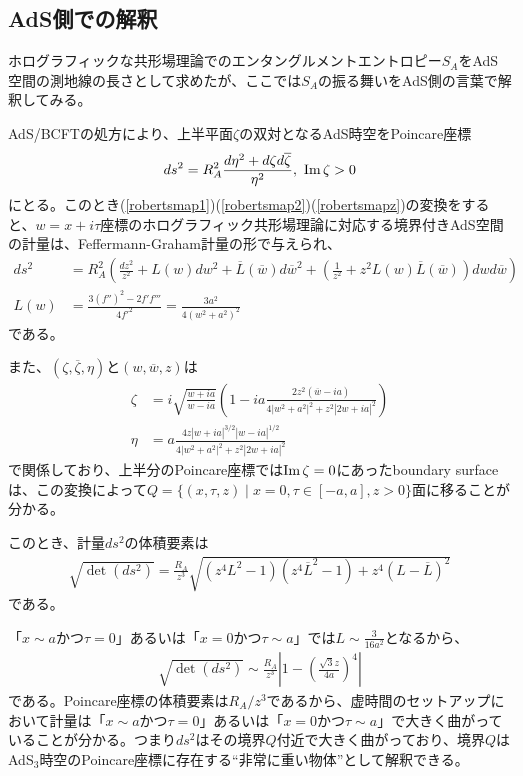 \subsection{AdS側での解釈}
ホログラフィックな共形場理論でのエンタングルメントエントロピー$S_A$をAdS空間の測地線の長さとして求めたが、ここでは$S_A$の振る舞いをAdS側の言葉で解釈してみる。

AdS/BCFTの処方により、上半平面$\zeta$の双対となるAdS時空をPoincare座標
\begin{align}
ds^2 = R_A^2 \frac{d\eta^2+d\zeta d\overline{\zeta}}{\eta^2},\ \text{Im}\, \zeta>0
\end{align}
にとる。このとき(\ref{robertsmap1})(\ref{robertsmap2})(\ref{robertsmapz})の変換をすると、$w=x+i\tau$座標のホログラフィック共形場理論に対応する境界付きAdS空間の計量は、Feffermann-Graham計量の形で与えられ、
\begin{align}
ds^2&=R_A^2 \left( \frac{dz^2}{z^2}+L(w)dw^2+\overline{L}(\overline{w})d\overline{w}^2+\left( \frac{1}{z^2}+ z^2L(w)\overline{L}(\overline{w})\right)dwd\overline{w}  \right)\\
L(w)&=\frac{3(f'')^2-2f'f'''}{4f'^2}=\frac{3a^2}{4(w^2+a^2)^2}
\end{align}
である。

また、$(\zeta,\overline{\zeta},\eta)$と$(w,\overline{w},z)$は
\begin{align}
\zeta&=i\sqrt{\frac{w+ia}{w-ia}}\left( 1-ia\frac{2z^2(\overline{w}-ia)}{4|w^2+a^2|^2+z^2|2w+ia|^2} \right)\\
\eta&=a\frac{4z|w+ia|^{3/2}|w-ia|^{1/2}}{4|w^2+a^2|^2+z^2|2w+ia|^2}
\end{align}
で関係しており、上半分のPoincare座標では$\text{Im}\, \zeta=0$にあったboundary surfaceは、この変換によって$Q=\{(x,\tau,z)\mid x=0, \tau\in [-a,a], z>0 \}$面に移ることが分かる。

このとき、計量$ds^2$の体積要素は
\begin{align}
\sqrt{\det(ds^2)}=\frac{R_A}{z^3}\sqrt{ (z^4L^2-1)(z^4\overline{L}^2-1)+z^4(L-\overline{L})^2}
\end{align}
である。

「$x\sim a$かつ$\tau=0$」あるいは「$x=0$かつ$\tau\sim a$」では$L\sim \frac{3}{16 a^2}$となるから、
\begin{align}
\sqrt{\det(ds^2)}\sim \frac{R_A}{z^3}\left|1-\left(\frac{\sqrt{3}z}{4a}\right)^4\right|
\end{align}
である。Poincare座標の体積要素は$R_A/z^3$であるから、虚時間のセットアップにおいて計量は「$x\sim a$かつ$\tau=0$」あるいは「$x=0$かつ$\tau\sim a$」で大きく曲がっていることが分かる。つまり$ds^2$はその境界$Q$付近で大きく曲がっており、境界$Q$はAdS$_3$時空のPoincare座標に存在する``非常に重い物体''として解釈できる。

